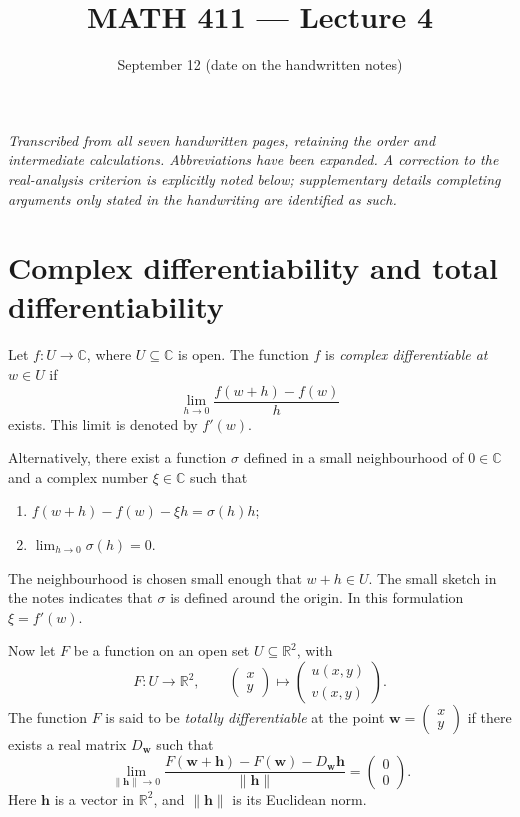 \documentclass[11pt]{article}
\title{MATH 411 --- Lecture 4}
\author{}
\date{September 12 (date on the handwritten notes)}
\newcommand{\C}{\mathbb C}
\newcommand{\R}{\mathbb R}
\newcommand{\ww}{\mathbf w}
\newcommand{\hh}{\mathbf h}
\begin{document}
\maketitle
\vspace{-2em}
\textit{Transcribed from all seven handwritten pages, retaining the order and
intermediate calculations. Abbreviations have been expanded. A correction to
the real-analysis criterion is explicitly noted below; supplementary details
completing arguments only stated in the handwriting are identified as such.}

\section{Complex differentiability and total differentiability}
Let $f:U\to\C$, where $U\subseteq\C$ is open. The function $f$ is
\emph{complex differentiable at $w\in U$} if
\[
 \lim_{h\to0}\frac{f(w+h)-f(w)}{h}
\]
exists. This limit is denoted by $f'(w)$.

Alternatively, there exist a function $\sigma$ defined in a small
neighbourhood of $0\in\C$ and a complex number $\xi\in\C$ such that
\begin{enumerate}
\item $f(w+h)-f(w)-\xi h=\sigma(h)h$;
\item $\displaystyle\lim_{h\to0}\sigma(h)=0$.
\end{enumerate}
The neighbourhood is chosen small enough that $w+h\in U$. The small sketch
in the notes indicates that $\sigma$ is defined around the origin.
In this formulation $\xi=f'(w)$.

Now let $F$ be a function on an open set $U\subseteq\R^2$, with
\[
 F:U\to\R^2,\qquad
 \begin{pmatrix}x\\y\end{pmatrix}\longmapsto
 \begin{pmatrix}u(x,y)\\v(x,y)\end{pmatrix}.
\]
The function $F$ is said to be \emph{totally differentiable} at the point
$\ww=\begin{pmatrix}x\\y\end{pmatrix}$ if there exists a real matrix
$D_{\ww}$ such that
\[
 \lim_{\|\hh\|\to0}
 \frac{F(\ww+\hh)-F(\ww)-D_{\ww}\hh}{\|\hh\|}
 =\begin{pmatrix}0\\0\end{pmatrix}.
\]
Here $\hh$ is a vector in $\R^2$, and $\|\hh\|$ is its Euclidean norm.
\end{document}
